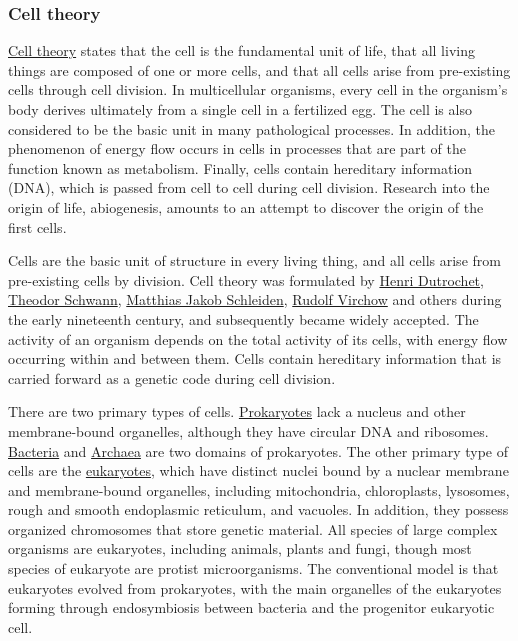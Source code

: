 \documentclass[
]{article}
\begin{document}
\hypertarget{cell-theory}{%
\subsubsection{Cell theory}\label{cell-theory}}

\href{https://en.wikipedia.org/wiki/Cell_theory}{Cell theory} states
that the cell is the fundamental unit of life, that all living things
are composed of one or more cells, and that all cells arise from
pre-existing cells through cell division. In multicellular organisms,
every cell in the organism's body derives ultimately from a single cell
in a fertilized egg. The cell is also considered to be the basic unit in
many pathological processes. In addition, the phenomenon of energy flow
occurs in cells in processes that are part of the function known as
metabolism. Finally, cells contain hereditary information (DNA), which
is passed from cell to cell during cell division. Research into the
origin of life, abiogenesis, amounts to an attempt to discover the
origin of the first cells.

Cells are the basic unit of structure in every living thing, and all
cells arise from pre-existing cells by division. Cell theory was
formulated by \href{https://en.wikipedia.org/wiki/Henri_Dutrochet}{Henri
Dutrochet}, \href{https://en.wikipedia.org/wiki/Theodor_Schwann}{Theodor
Schwann},
\href{https://en.wikipedia.org/wiki/Matthias_Jakob_Schleiden}{Matthias
Jakob Schleiden},
\href{https://en.wikipedia.org/wiki/Rudolf_Virchow}{Rudolf Virchow} and
others during the early nineteenth century, and subsequently became
widely accepted. The activity of an organism depends on the total
activity of its cells, with energy flow occurring within and between
them. Cells contain hereditary information that is carried forward as a
genetic code during cell division.

There are two primary types of cells.
\href{https://en.wikipedia.org/wiki/Prokaryote}{Prokaryotes} lack a
nucleus and other membrane-bound organelles, although they have circular
DNA and ribosomes.
\href{https://en.wikipedia.org/wiki/Bacteria}{Bacteria} and
\href{https://en.wikipedia.org/wiki/Archaea}{Archaea} are two domains of
prokaryotes. The other primary type of cells are the
\href{https://en.wikipedia.org/wiki/Eukaryote}{eukaryotes}, which have
distinct nuclei bound by a nuclear membrane and membrane-bound
organelles, including mitochondria, chloroplasts, lysosomes, rough and
smooth endoplasmic reticulum, and vacuoles. In addition, they possess
organized chromosomes that store genetic material. All species of large
complex organisms are eukaryotes, including animals, plants and fungi,
though most species of eukaryote are protist microorganisms. The
conventional model is that eukaryotes evolved from prokaryotes, with the
main organelles of the eukaryotes forming through endosymbiosis between
bacteria and the progenitor eukaryotic cell.
\end{document}
